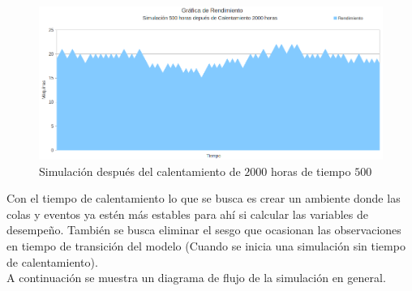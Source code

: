 \documentclass[12pt]{article}
\begin{document}
\begin{figure}
  \centering
	\includegraphics[scale=0.6]{graf4.png} 
  \caption{Simulaci\'on despu\'es del calentamiento de $2000$ horas de tiempo $500$}
  \label{fig:cal2}
\end{figure}

\newpage



Con el tiempo de calentamiento lo que se busca es crear un ambiente donde las colas y eventos ya estén más estables para ahí si calcular las variables de desempeño. También se busca eliminar el sesgo que ocasionan las observaciones en tiempo de transición del modelo (Cuando se inicia una simulación sin tiempo de calentamiento). \\


A continuación se muestra un diagrama de flujo de la simulación en general.\\
\end{document}
